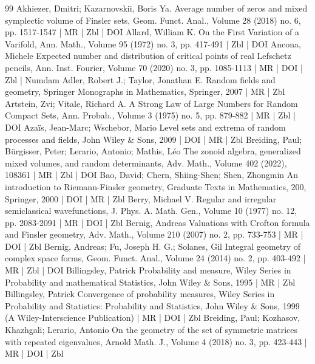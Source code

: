 \documentclass[10pt]{amsart}
\theoremstyle{definition}\newtheorem{defi}[theo]{Definition}\newtheorem{rema}[theo]{Remark}\newtheorem{exam}[theo]{Example}\newtheorem{exem}[theo]{Example}\newtheorem{nota}[theo]{Notation}
\begin{document}
\begin{thebibliography}{99}
Akhiezer, Dmitri; Kazarnovskii, Boris Ya. Average number of zeros and mixed symplectic volume of Finsler sets, Geom. Funct. Anal., Volume 28 (2018) no. 6, pp. 1517-1547 | MR | Zbl | DOI
Allard, William K. On the First Variation of a Varifold, Ann. Math., Volume 95 (1972) no. 3, pp. 417-491 | Zbl | DOI
Ancona, Michele Expected number and distribution of critical points of real Lefschetz pencils, Ann. Inst. Fourier, Volume 70 (2020) no. 3, pp. 1085-1113 | MR | DOI | Zbl | Numdam
Adler, Robert J.; Taylor, Jonathan E. Random fields and geometry, Springer Monographs in Mathematics, Springer, 2007 | MR | Zbl
Artstein, Zvi; Vitale, Richard A. A Strong Law of Large Numbers for Random Compact Sets, Ann. Probab., Volume 3 (1975) no. 5, pp. 879-882 | MR | Zbl | DOI
Azaïs, Jean-Marc; Wschebor, Mario Level sets and extrema of random processes and fields, John Wiley \& Sons, 2009 | DOI | MR | Zbl
Breiding, Paul; Bürgisser, Peter; Lerario, Antonio; Mathis, Léo The zonoid algebra, generalized mixed volumes, and random determinants, Adv. Math., Volume 402 (2022), 108361 | MR | Zbl | DOI
Bao, David; Chern, Shiing-Shen; Shen, Zhongmin An introduction to Riemann-Finsler geometry, Graduate Texts in Mathematics, 200, Springer, 2000 | DOI | MR | Zbl
Berry, Michael V. Regular and irregular semiclassical wavefunctions, J. Phys. A. Math. Gen., Volume 10 (1977) no. 12, pp. 2083-2091 | MR | DOI | Zbl
Bernig, Andreas Valuations with Crofton formula and Finsler geometry, Adv. Math., Volume 210 (2007) no. 2, pp. 733-753 | MR | DOI | Zbl
Bernig, Andreas; Fu, Joseph H. G.; Solanes, Gil Integral geometry of complex space forms, Geom. Funct. Anal., Volume 24 (2014) no. 2, pp. 403-492 | MR | Zbl | DOI
Billingsley, Patrick Probability and measure, Wiley Series in Probability and mathematical Statistics, John Wiley \& Sons, 1995 | MR | Zbl
Billingsley, Patrick Convergence of probability measures, Wiley Series in Probability and Statistics: Probability and Statistics, John Wiley \& Sons, 1999 (A Wiley-Interscience Publication) | MR | DOI | Zbl
Breiding, Paul; Kozhasov, Khazhgali; Lerario, Antonio On the geometry of the set of symmetric matrices with repeated eigenvalues, Arnold Math. J., Volume 4 (2018) no. 3, pp. 423-443 | MR | DOI | Zbl

\end{thebibliography}
\end{document}
